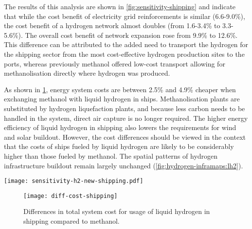 The results of this analysis are shown in \cref{fig:sensitivity-shipping} and
indicate that while the cost benefit of electricity grid reinforcements is
similar (6.6-9.0\%), the cost benefit of a hydrogen network almost doubles (from
1.6-3.4\% to 3.3-5.6\%). The overall cost benefit of network expansion rose from
9.9\% to 12.6\%. This difference can be attributed to the added need to
transport the hydrogen for the shipping sector from the most cost-effective
hydrogen production sites to the ports, whereas previously methanol offered
low-cost transport allowing for methanolisation directly where hydrogen was
produced.

As shown in \cref{fig:sensitivity-shipping-diff}, energy system costs are
between 2.5\% and 4.9\% cheaper when exchanging methanol with liquid hydrogen in
ships. Methanolisation plants are substituted by hydrogen liquefaction plants,
and because less carbon needs to be handled in the system, direct air capture is
no longer required. The higher energy efficiency of liquid hydrogen in shipping
also lowers the requirements for wind and solar buildout. However, the cost
differences should be viewed in the context that the costs of ships fueled by
liquid hydrogen are likely to be considerably higher than those fueled by
methanol. The spatial patterns of hydrogen
infrastructure buildout remain largely unchanged
(\cref{fig:hydrogen-inframaps:lh2}).

\begin{SCfigure}
    \centering
    \texttt{[image: sensitivity-h2-new-shipping.pdf]}
    \caption{Cost benefits of electricity and hydrogen network infrastructure with use of liquid hydrogen in shipping instead of methanol.}
    \label{fig:sensitivity-shipping}
\end{SCfigure}

\begin{figure}
    \centering
    \texttt{[image: diff-cost-shipping]}
    \caption{Differences in total system cost for usage of liquid hydrogen in shipping compared to methanol.}
    \label{fig:sensitivity-shipping-diff}
\end{figure}

